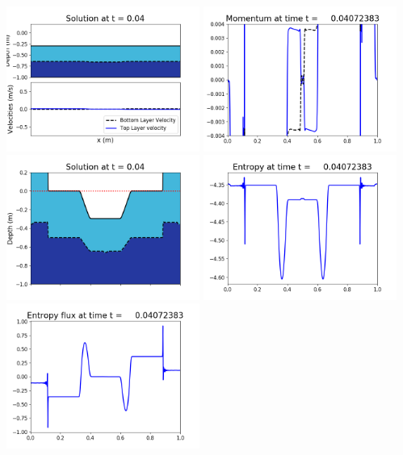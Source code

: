 \documentclass[11pt]{article}
\begin{document}
\includegraphics[width=0.475\textwidth]{frame0094fig1002.png}
\vskip 10pt 
\includegraphics[width=0.475\textwidth]{frame0094fig1003.png}
\includegraphics[width=0.475\textwidth]{frame0094fig1006.png}
\vskip 10pt 
\includegraphics[width=0.475\textwidth]{frame0094fig1007.png}
\includegraphics[width=0.475\textwidth]{frame0094fig1008.png}
\end{document}
